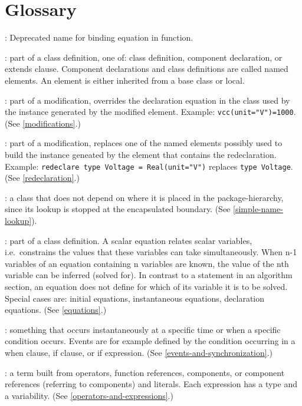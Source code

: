 \chapter{Glossary}\label{glossary}

: Deprecated name for binding equation in function.

: part of a class definition, one of: class definition,
component declaration, or extends clause. Component declarations and
class definitions are called named elements. An element is either
inherited from a base class or local.

: part of a modification, overrides the
declaration equation in the class used by the instance generated by the
modified element. Example: \lstinline!vcc(unit="V")=1000!. (See \cref{modifications}.)

: part of a modification, replaces one of
the named elements possibly used to build the instance geneated by the
element that contains the redeclaration. Example: \lstinline!redeclare type Voltage = Real(unit="V")! replaces \lstinline!type Voltage!. (See \cref{redeclaration}.)

: a class that does not depend on where it is
placed in the package-hierarchy, since its lookup is stopped at the
encapsulated boundary. (See \cref{simple-name-lookup}).

: part of a class definition. A scalar equation relates
scalar variables, i.e.\ constrains the values that these variables can
take simultaneously. When n-1 variables of an equation containing n
variables are known, the value of the nth variable can be inferred
(solved for). In contrast to a statement in an algorithm section, an
equation does not define for which of its variable it is to be solved.
Special cases are: initial equations, instantaneous equations,
declaration equations. (See \cref{equations}.)

: something that occurs instantaneously at a specific time
or when a specific condition occurs. Events are for example defined by
the condition occurring in a when clause, if clause, or if expression.
(See \cref{events-and-synchronization}.)

: a term built from operators, function references,
components, or component references (referring to components) and
literals. Each expression has a type and a variability. (See \cref{operators-and-expressions}.)

